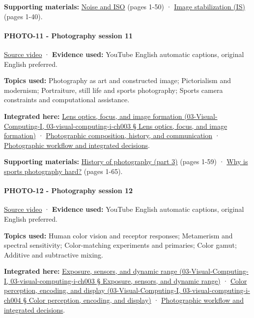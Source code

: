 \textbf{Supporting materials:} \href{https://drive.google.com/open?id=0B6w2XfPHEcZYS2xETmR4SVlIczg}{Noise and ISO} (pages 1-50) · \href{https://drive.google.com/open?id=0B6w2XfPHEcZYcFpESFU4dEM3QkE}{Image stabilization (IS)} (pages 1-40).

\paragraph{PHOTO-11 - Photography session 11}\label{photo-11---photography-session-11}

\href{https://www.youtube.com/watch?v=AaJz5RMtO4c}{Source video} · \textbf{Evidence used:} YouTube English automatic captions, original English preferred.

\textbf{Topics used:} Photography as art and constructed image; Pictorialism and modernism; Portraiture, still life and sports photography; Sports camera constraints and computational assistance.

\textbf{Integrated here:} \href{}{Lens optics, focus, and image formation (03-Visual-Computing-I, 03-visual-computing-i-ch003 § Lens optics, focus, and image formation)} · \hyperref[04-visual-computing-ii-ch034]{Photographic composition, history, and communication} · \hyperref[04-visual-computing-ii-ch034]{Photographic workflow and integrated decisions}.

\textbf{Supporting materials:} \href{https://drive.google.com/open?id=0B6w2XfPHEcZYU1hzN1BtalBqQ1U}{History of photography (part 3)} (pages 1-59) · \href{https://drive.google.com/open?id=0B6w2XfPHEcZYc1BpLTNjZGUzbk0}{Why is sports photography hard?} (pages 1-65).

\paragraph{PHOTO-12 - Photography session 12}\label{photo-12---photography-session-12}

\href{https://www.youtube.com/watch?v=gRT0mtabjI4}{Source video} · \textbf{Evidence used:} YouTube English automatic captions, original English preferred.

\textbf{Topics used:} Human color vision and receptor responses; Metamerism and spectral sensitivity; Color-matching experiments and primaries; Color gamut; Additive and subtractive mixing.

\textbf{Integrated here:} \href{}{Exposure, sensors, and dynamic range (03-Visual-Computing-I, 03-visual-computing-i-ch003 § Exposure, sensors, and dynamic range)} · \href{}{Color perception, encoding, and display (03-Visual-Computing-I, 03-visual-computing-i-ch004 § Color perception, encoding, and display)} · \hyperref[04-visual-computing-ii-ch034]{Photographic workflow and integrated decisions}.

